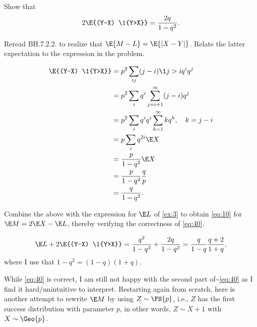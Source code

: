 \documentclass[a4paper]{article}
\begin{document}
\begin{exercise}
Show that
\begin{equation*}
\label{eq:41}
2\E{(Y-X) \1{Y>X}} = \frac{2q} {1-q^{2}}.
\end{equation*}
\begin{hint}
Reread BH.7.2.2. to realize that \(\E{M-L} = \E{|X-Y|}\). Relate the latter expectation to the expression in the problem.
\end{hint}
\begin{solution}
  \begin{align*}
\E{(Y-X) \1{Y>X}}
&= p^2\sum_{ij} (j-i)\1{j>i} q^iq^j\\
&= p^2\sum_{i} q^i\sum_{j=i+1}^{\infty}(j-i)q^j\\
&= p^2\sum_{i} q^i q^{i}\sum_{k=1}^{\infty}kq^k, \quad k = j-i\\
&= p\sum_{i}  q^{2i}\E X \\
&= \frac{p}{1-q^{2}}\E X \\
&= \frac{p}{1-q^{2}}\frac q p \\
&= \frac{q}{1-q^{2}}.
  \end{align*}
\end{solution}
\end{exercise}

\begin{exercise}
Combine the above with the expression for \(\E L\) of \cref{ex:3} to obtain  \cref{eq:10} for \(\E M = 2\E X - \E L\), thereby verifying the correctness of \cref{eq:40}.
\begin{hint}
\end{hint}
\begin{solution}
\begin{align*}
\E L + 2  \E{(Y-X) \1{Y>X}} = \frac{q^{2}}{1-q^2} +  \frac{2q}{1-q^{2}} = \frac q{1-q}\frac{q+2}{1+q},
\end{align*}
where I use that \(1-q^{2}=(1-q)(1+q)\).
\end{solution}
\end{exercise}


While \cref{eq:40} is correct, I am still not happy with the second part of\textasciitilde{}\eqref{eq:40} as I find it hard/unintuitive to interpret.
Restarting again from scratch, here is another attempt to rewrite \(\E M\) by using \(Z\sim \FS{p}\), i.e., \(Z\) has the first success distribution with parameter \(p\), in other words, \(Z \sim X+1\) with \(X\sim\Geo{p}\).
\end{document}
